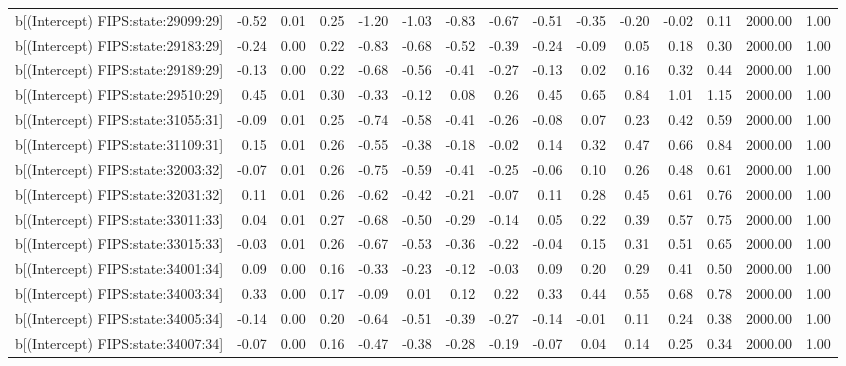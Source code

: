 \begin{table}[ht]
\begin{tabular}{rrrrrrrrrrrrrrr}
  b[(Intercept) FIPS:state:29099:29] & -0.52 & 0.01 & 0.25 & -1.20 & -1.03 & -0.83 & -0.67 & -0.51 & -0.35 & -0.20 & -0.02 & 0.11 & 2000.00 & 1.00 \\ 
  b[(Intercept) FIPS:state:29183:29] & -0.24 & 0.00 & 0.22 & -0.83 & -0.68 & -0.52 & -0.39 & -0.24 & -0.09 & 0.05 & 0.18 & 0.30 & 2000.00 & 1.00 \\ 
  b[(Intercept) FIPS:state:29189:29] & -0.13 & 0.00 & 0.22 & -0.68 & -0.56 & -0.41 & -0.27 & -0.13 & 0.02 & 0.16 & 0.32 & 0.44 & 2000.00 & 1.00 \\ 
  b[(Intercept) FIPS:state:29510:29] & 0.45 & 0.01 & 0.30 & -0.33 & -0.12 & 0.08 & 0.26 & 0.45 & 0.65 & 0.84 & 1.01 & 1.15 & 2000.00 & 1.00 \\ 
  b[(Intercept) FIPS:state:31055:31] & -0.09 & 0.01 & 0.25 & -0.74 & -0.58 & -0.41 & -0.26 & -0.08 & 0.07 & 0.23 & 0.42 & 0.59 & 2000.00 & 1.00 \\ 
  b[(Intercept) FIPS:state:31109:31] & 0.15 & 0.01 & 0.26 & -0.55 & -0.38 & -0.18 & -0.02 & 0.14 & 0.32 & 0.47 & 0.66 & 0.84 & 2000.00 & 1.00 \\ 
  b[(Intercept) FIPS:state:32003:32] & -0.07 & 0.01 & 0.26 & -0.75 & -0.59 & -0.41 & -0.25 & -0.06 & 0.10 & 0.26 & 0.48 & 0.61 & 2000.00 & 1.00 \\ 
  b[(Intercept) FIPS:state:32031:32] & 0.11 & 0.01 & 0.26 & -0.62 & -0.42 & -0.21 & -0.07 & 0.11 & 0.28 & 0.45 & 0.61 & 0.76 & 2000.00 & 1.00 \\ 
  b[(Intercept) FIPS:state:33011:33] & 0.04 & 0.01 & 0.27 & -0.68 & -0.50 & -0.29 & -0.14 & 0.05 & 0.22 & 0.39 & 0.57 & 0.75 & 2000.00 & 1.00 \\ 
  b[(Intercept) FIPS:state:33015:33] & -0.03 & 0.01 & 0.26 & -0.67 & -0.53 & -0.36 & -0.22 & -0.04 & 0.15 & 0.31 & 0.51 & 0.65 & 2000.00 & 1.00 \\ 
  b[(Intercept) FIPS:state:34001:34] & 0.09 & 0.00 & 0.16 & -0.33 & -0.23 & -0.12 & -0.03 & 0.09 & 0.20 & 0.29 & 0.41 & 0.50 & 2000.00 & 1.00 \\ 
  b[(Intercept) FIPS:state:34003:34] & 0.33 & 0.00 & 0.17 & -0.09 & 0.01 & 0.12 & 0.22 & 0.33 & 0.44 & 0.55 & 0.68 & 0.78 & 2000.00 & 1.00 \\ 
  b[(Intercept) FIPS:state:34005:34] & -0.14 & 0.00 & 0.20 & -0.64 & -0.51 & -0.39 & -0.27 & -0.14 & -0.01 & 0.11 & 0.24 & 0.38 & 2000.00 & 1.00 \\ 
  b[(Intercept) FIPS:state:34007:34] & -0.07 & 0.00 & 0.16 & -0.47 & -0.38 & -0.28 & -0.19 & -0.07 & 0.04 & 0.14 & 0.25 & 0.34 & 2000.00 & 1.00 \\ 

\end{tabular}
\end{table}
